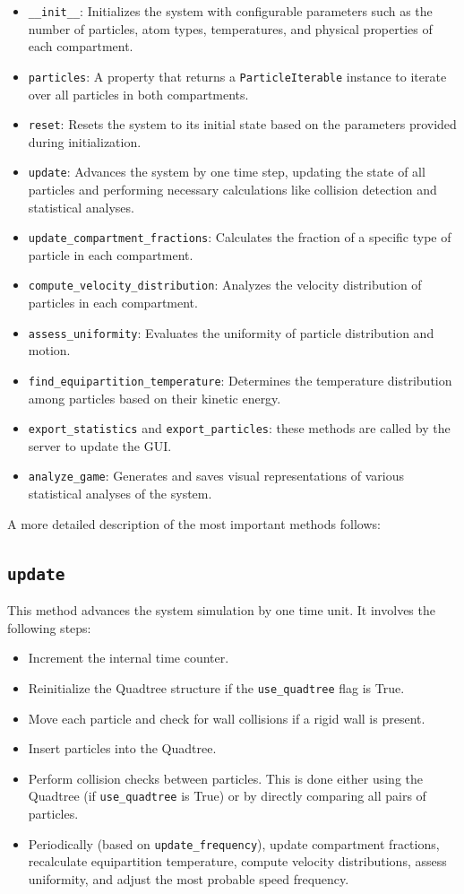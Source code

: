 \documentclass[10pt]{article}
\begin{document}
\begin{itemize}
    \itemsep-0.2em
    \item \texttt{\_\_init\_\_}: Initializes the system with configurable parameters such as the number of particles, atom types, temperatures, and physical properties of each compartment.
    \item \texttt{particles}: A property that returns a \texttt{ParticleIterable} instance to iterate over all particles in both compartments.
    \item \texttt{reset}: Resets the system to its initial state based on the parameters provided during initialization.
    \item \texttt{update}: Advances the system by one time step, updating the state of all particles and performing necessary calculations like collision detection and statistical analyses.
    \item \texttt{update\_compartment\_fractions}: Calculates the fraction of a specific type of particle in each compartment.
    \item \texttt{compute\_velocity\_distribution}: Analyzes the velocity distribution of particles in each compartment.
    \item \texttt{assess\_uniformity}: Evaluates the uniformity of particle distribution and motion.
    \item \texttt{find\_equipartition\_temperature}: Determines the temperature distribution among particles based on their kinetic energy.
    \item \texttt{export\_statistics} and \texttt{export\_particles}: these methods are called by the server to update the GUI.
    \item \texttt{analyze\_game}: Generates and saves visual representations of various statistical analyses of the system.
\end{itemize}

A more detailed description of the most important methods follows:
\subsection*{\texttt{update}}
This method advances the system simulation by one time unit. It involves the following steps:
\begin{itemize}
    \itemsep-0.2em
    \item Increment the internal time counter.
    \item Reinitialize the Quadtree structure if the \texttt{use\_quadtree} flag is True.
    \item Move each particle and check for wall collisions if a rigid wall is present.
    \item Insert particles into the Quadtree.
    \item Perform collision checks between particles. This is done either using the Quadtree (if \texttt{use\_quadtree} is True) or by directly comparing all pairs of particles.
    \item Periodically (based on \texttt{update\_frequency}), update compartment fractions, recalculate equipartition temperature, compute velocity distributions, assess uniformity, and adjust the most probable speed frequency.
\end{itemize}
\end{document}
